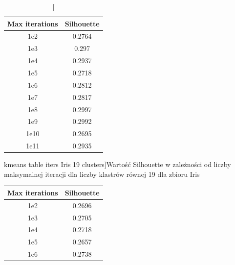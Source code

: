 \documentclass{classrep}
\begin{document}
{{\begin{table}[!htbp]
                \hfill
                \begin{minipage}{.48\textwidth}
                    \centering
                    \begin{tabular}{|c|c|}
                        \hline
                        Max iterations & Silhouette \\ \hline
                        1e2 & 0.2764 \\ \hline
                        1e3 & 0.297 \\ \hline
                        1e4 & 0.2937 \\ \hline
                        1e5 & 0.2718 \\ \hline
                        1e6 & 0.2812 \\ \hline
                        1e7 & 0.2817 \\ \hline
                        1e8 & 0.2997 \\ \hline
                        1e9 & 0.2992 \\ \hline
                        1e10 & 0.2695 \\ \hline
                        1e11 & 0.2935 \\ \hline
                    \end{tabular}
                    \caption
                    [kmeans table iters Iris 19 clusters]{Wartość Silhouette w
                    zależności od liczby maksymalnej iteracji dla liczby klastrów
                    równej 19 dla zbioru Iris}
                    \label{kmeans_table_iters_Iris_19_clusters}
                \end{minipage}
                \hfill
            \end{table}
            \FloatBarrier
            \begin{table}[!htbp]
                \begin{minipage}{.5\textwidth}
                    \centering
                    \begin{tabular}{|c|c|}
                        \hline
                        Max iterations & Silhouette \\ \hline
                        1e2 & 0.2696 \\ \hline
                        1e3 & 0.2705 \\ \hline
                        1e4 & 0.2718 \\ \hline
                        1e5 & 0.2657 \\ \hline
                        1e6 & 0.2738 \\ \hline

\end{tabular}
\end{minipage}
\end{table}}}
\end{document}
